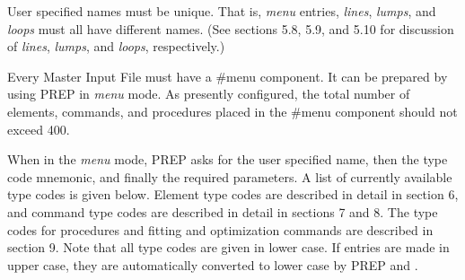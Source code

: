 User specified names must be unique. That is, {\em menu} entries, {\em
lines}, {\em lumps}, and {\em loops} must all have different names. (See
sections 5.8, 5.9, and 5.10 for discussion of {\em lines}, {\em lumps}, and
{\em loops}, respectively.)

Every Master Input File must have a \#menu component. It can be prepared by
using PREP in {\em menu} mode. As presently configured, the total number of
elements, commands, and procedures placed in the \#menu component should
not exceed 400.

When in the {\em menu} mode, PREP asks for the user specified name, then
the type code mnemonic, and finally the required parameters. A list of
currently available type codes is given below. Element type codes are
described in detail in section 6, and command type codes are described in
detail in sections 7 and 8. The type codes for procedures and fitting and
optimization commands are described in section 9. Note that all type codes
are given in lower case. If entries are made in upper case, they are
automatically converted to lower case by PREP and \Maryend.


